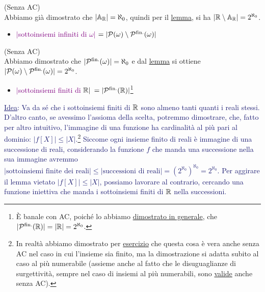 \begin{soln}
	(Senza AC)\\
	Abbiamo gi\`a dimostrato che $|\mathbb A_\mathbb R| = \aleph_0$, quindi per il \hyperref[continuo-numerabile]{lemma}, si ha $|\mathbb R \setminus \mathbb{A}_{\mathbb R}| = 2^{\aleph_0}$.
\end{soln}

\begin{itemize}
	\item \textcolor{purple}{$|$sottoinsiemi infiniti di $\omega|$ $= |\mathcal{P}(\omega) \setminus \mathcal{P}^{\text{fin.}}(\omega)|$}
\end{itemize}

\begin{soln}
	(Senza AC)\\
	Abbiamo dimostrato che $|\mathcal{P}^{\text{fin.}}(\omega)| = \aleph_0$ e dal \hyperref[continuo-numerabile]{lemma} si ottiene $|\mathcal{P}(\omega) \setminus \mathcal{P}^{\text{fin.}}(\omega)| = 2^{\aleph_0}$.
\end{soln}

\begin{itemize}
	\item \textcolor{purple}{$|$sottoinsiemi finiti di $\mathbb R|$ $= |\mathcal{P}^{\text{fin.}}(\mathbb R)|$}\footnote{\`E banale con AC, poich\'e lo abbiamo \hyperref[parti_finite_generale]{dimostrato in generale}, che $|\mathcal{P}^{\text{fin.}}(\mathbb R)| = |\mathbb R| = 2^{\aleph_0}$.}
\end{itemize}

\textcolor{MidnightBlue}{\underline{Idea}: Va da s\'e che i sottoinsiemi finiti di $\mathbb R$ sono almeno tanti quanti i reali stessi. D'altro canto, se avessimo l'assioma della scelta,
potremmo dimostrare, che, fatto per altro intuitivo, l'immagine di una funzione ha cardinalit\`a al pi\`u pari al dominio: $|f[X]| \leq |X|$.\footnote{In realt\`a abbiamo dimostrato per \hyperref[disuguaglianze_senza_AC1]{esercizio} che questa cosa \`e vera anche senza AC nel caso in cui l'insieme sia finito, ma la dimostrazione si adatta subito al caso al pi\`u numerabile (assieme anche al fatto che le disuguaglianze di surgettivit\`a, sempre nel caso di insiemi al pi\`u numerabili, sono \hyperref[disuguaglianze_senza_AC2]{valide} anche senza AC).}
Siccome ogni insieme finito di reali \`e immagine di una successione di reali, considerando la funzione $f$ che manda una successione nella sua immagine avremmo $|\text{sottoinsiemi finite dei reali}| \leq |\text{successioni di reali}| = (2^{\aleph_0})^{\aleph_0} = 2^{\aleph_0}$.
Per aggirare il lemma vietato $|f[X]|\leq |X|$, possiamo lavorare al contrario, cercando una funzione iniettiva che manda i sottoinsiemi finiti di $\mathbb R$ nella successioni.}

